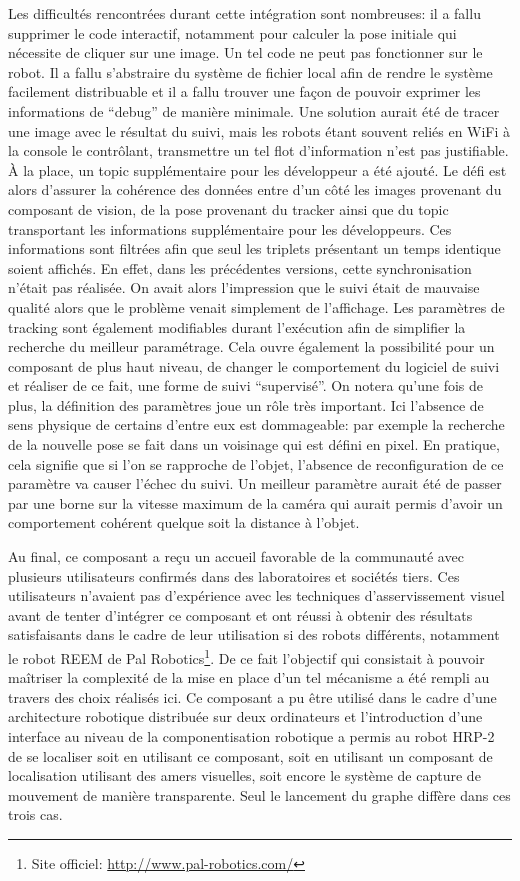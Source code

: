 Les difficultés rencontrées durant cette intégration sont nombreuses:
il a fallu supprimer le code interactif, notamment pour calculer la
pose initiale qui nécessite de cliquer sur une image. Un tel code ne
peut pas fonctionner sur le robot. Il a fallu s'abstraire du système
de fichier local afin de rendre le système facilement distribuable et
il a fallu trouver une façon de pouvoir exprimer les informations de
``debug'' de manière minimale. Une solution aurait été de tracer une
image avec le résultat du suivi, mais les robots étant souvent reliés
en WiFi à la console le contrôlant, transmettre un tel flot
d'information n'est pas justifiable. À la place, un topic
supplémentaire pour les développeur a été ajouté. Le défi est alors
d'assurer la cohérence des données entre d'un côté les images
provenant du composant de vision, de la pose provenant du tracker
ainsi que du topic transportant les informations supplémentaire pour
les développeurs. Ces informations sont filtrées afin que seul les
triplets présentant un temps identique soient affichés. En effet, dans
les précédentes versions, cette synchronisation n'était pas
réalisée. On avait alors l'impression que le suivi était de mauvaise
qualité alors que le problème venait simplement de l'affichage. Les
paramètres de tracking sont également modifiables durant l'exécution
afin de simplifier la recherche du meilleur paramétrage. Cela ouvre
également la possibilité pour un composant de plus haut niveau, de
changer le comportement du logiciel de suivi et réaliser de ce fait,
une forme de suivi ``supervisé''. On notera qu'une fois de plus, la
définition des paramètres joue un rôle très important. Ici l'absence
de sens physique de certains d'entre eux est dommageable: par exemple
la recherche de la nouvelle pose se fait dans un voisinage qui est
défini en pixel. En pratique, cela signifie que si l'on se rapproche
de l'objet, l'absence de reconfiguration de ce paramètre va causer
l'échec du suivi. Un meilleur paramètre aurait été de passer par une
borne sur la vitesse maximum de la caméra qui aurait permis d'avoir un
comportement cohérent quelque soit la distance à l'objet.


Au final, ce composant a reçu un accueil favorable de la communauté
avec plusieurs utilisateurs confirmés dans des laboratoires et
sociétés tiers. Ces utilisateurs n'avaient pas d'expérience avec les
techniques d'asservissement visuel avant de tenter d'intégrer ce
composant et ont réussi à obtenir des résultats satisfaisants dans le
cadre de leur utilisation si des robots différents, notamment le robot
REEM de Pal Robotics\footnote{Site officiel:
  \url{http://www.pal-robotics.com/}}. De ce fait l'objectif qui
consistait à pouvoir maîtriser la complexité de la mise en place d'un
tel mécanisme a été rempli au travers des choix réalisés ici. Ce
composant a pu être utilisé dans le cadre d'une architecture robotique
distribuée sur deux ordinateurs et l'introduction d'une interface au
niveau de la componentisation robotique a permis au robot HRP-2 de se
localiser soit en utilisant ce composant, soit en utilisant un
composant de localisation utilisant des amers visuelles, soit encore
le système de capture de mouvement de manière transparente. Seul le
lancement du graphe diffère dans ces trois cas.


